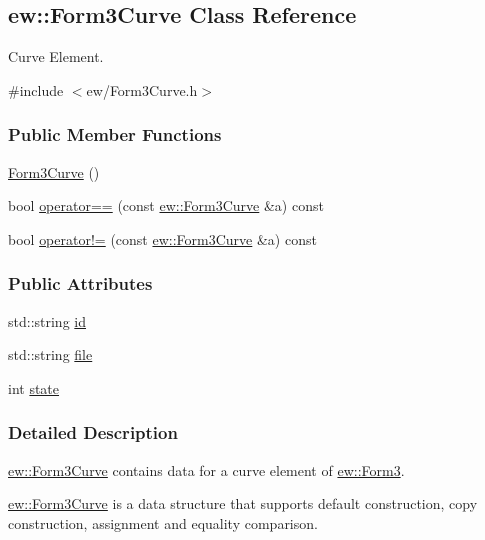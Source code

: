 \hypertarget{classew_1_1Form3Curve}{
\subsection{ew::Form3Curve Class Reference}
\label{classew_1_1Form3Curve}
}


Curve Element.  




{\ttfamily \#include $<$ew/Form3Curve.h$>$}

\subsubsection*{Public Member Functions}
\begin{DoxyCompactItemize}
\item 
\hyperlink{classew_1_1Form3Curve_a0e4f8903c5dcc5fdc6efb5c8510213a3}{Form3Curve} ()
\item 
bool \hyperlink{classew_1_1Form3Curve_af1f98d077e3fcedda52d3c49c1664329}{operator==} (const \hyperlink{classew_1_1Form3Curve}{ew::Form3Curve} \&a) const 
\item 
bool \hyperlink{classew_1_1Form3Curve_a2c7115c61a54525d3365b6823d7eeed5}{operator!=} (const \hyperlink{classew_1_1Form3Curve}{ew::Form3Curve} \&a) const 
\end{DoxyCompactItemize}
\subsubsection*{Public Attributes}
\begin{DoxyCompactItemize}
\item 
std::string \hyperlink{classew_1_1Form3Curve_a2bb3648bb9d075b67572de31ceb4f9c9}{id}
\item 
std::string \hyperlink{classew_1_1Form3Curve_ad5b09354438566c8f57710a5175858bb}{file}
\item 
int \hyperlink{classew_1_1Form3Curve_aa0dbff46b3f4b6463e81adfc6855d2ee}{state}
\end{DoxyCompactItemize}


\subsubsection{Detailed Description}
\hyperlink{classew_1_1Form3Curve}{ew::Form3Curve} contains data for a curve element of \hyperlink{classew_1_1Form3}{ew::Form3}.

\hyperlink{classew_1_1Form3Curve}{ew::Form3Curve} is a data structure that supports default construction, copy construction, assignment and equality comparison. 

